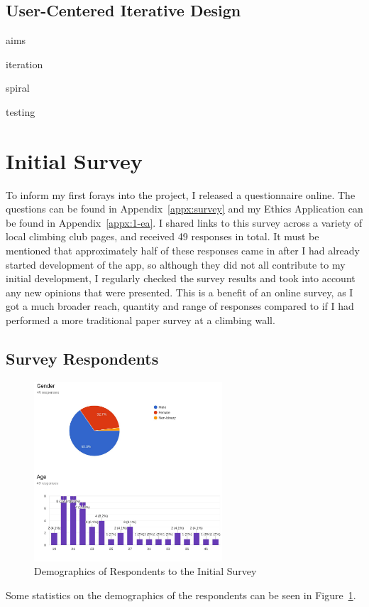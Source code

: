 \subsection{User-Centered Iterative Design}
aims

iteration

spiral

testing

\section{Initial Survey}
To inform my first forays into the project, I released a questionnaire online.
The questions can be found in Appendix~\ref{appx:survey} and my Ethics Application can be found in Appendix~\ref{appx:1-ea}.
I shared links to this survey across a variety of local climbing club pages, and received 49 responses in total. 
It must be mentioned that approximately half of these responses came in after I had already started development of the app, so although they did not all contribute to my initial development, I regularly checked the survey results and took into account any new opinions that were presented.
This is a benefit of an online survey, as I got a much broader reach, quantity and range of responses compared to if I had performed a more traditional paper survey at a climbing wall.

\clearpage
\subsection{Survey Respondents}
\begin{figure}
\includegraphics[width=7cm]{imgs/surveydemographics}
\caption{Demographics of Respondents to the Initial Survey}
\label{fig:surveydemographics}
\end{figure}
Some statistics on the demographics of the respondents can be seen in Figure~\ref{fig:surveydemographics}.

